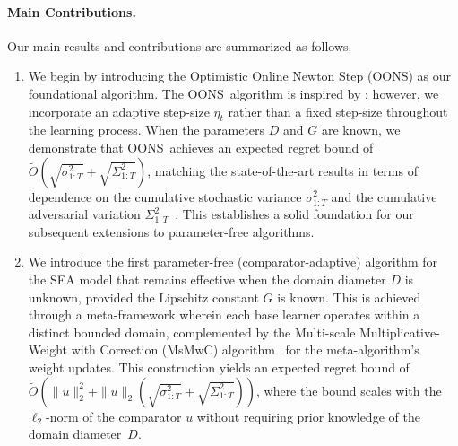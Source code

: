 \documentclass{article}
\renewcommand{\citet}{\citep}
\theoremstyle{plain}
\theoremstyle{definition}
\theoremstyle{remark}
\newcommand{\oons}{{\sc OONS}}
\renewcommand{\tilde}{\widetilde}
\begin{document}
\paragraph{Main Contributions.} Our main results and contributions are summarized as follows.
\begin{enumerate}[leftmargin=*, label=(\arabic*)]
\item[(1)] We begin by introducing the Optimistic Online Newton Step (OONS) as our foundational algorithm. The \oons\ algorithm is inspired by \citet{chen2021impossible}; however, we incorporate an adaptive step-size $\eta_t$ rather than a fixed step-size throughout the learning process. When the parameters $D$ and $G$ are known, we demonstrate that \oons\ achieves an expected regret bound of $\tilde{O}(\sqrt{\sigma^2_{1:T}} + \sqrt{\Sigma^2_{1:T}})$, matching the state-of-the-art results in terms of dependence on the cumulative stochastic variance $\sigma^2_{1:T}$ and the cumulative adversarial variation $\Sigma^2_{1:T}$~\cite{sachs2023accelerated, chen2024optimistic}. This establishes a solid foundation for our subsequent extensions to parameter-free algorithms.

\item[(2)] We introduce the first parameter-free (comparator-adaptive) algorithm for the SEA model that remains effective when the domain diameter $D$ is unknown, provided the Lipschitz constant $G$ is known. This is achieved through a meta-framework wherein each base learner operates within a distinct bounded domain, complemented by the Multi-scale Multiplicative-Weight with Correction (MsMwC) algorithm~\cite{chen2021impossible} for the meta-algorithm's weight updates. This construction yields an expected regret bound of $\tilde{O}(\|u\|_2^2 + \|u\|_2(\sqrt{\sigma^2_{1:T}} + \sqrt{\Sigma^2_{1:T}}))$, where the bound scales with the $\ell_2$-norm of the comparator $u$ without requiring prior knowledge of the domain diameter~$D$.


\end{enumerate}
\end{document}
